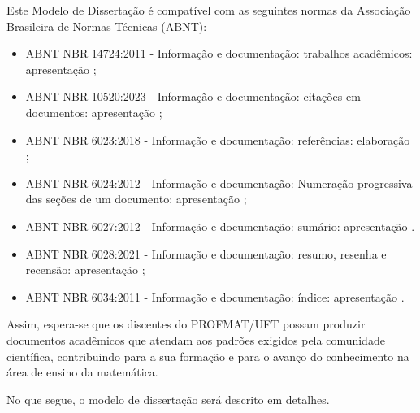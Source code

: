 Este Modelo de Dissertação é compatível com as seguintes normas da Associação Brasileira de Normas Técnicas (ABNT):

\begin{itemize}
	\item ABNT NBR 14724:2011 - Informação
e documentação: trabalhos acadêmicos: apresentação \cite{nbr14724};

    \item ABNT NBR 10520:2023 - Informação
e documentação: citações em documentos: apresentação \cite{nbr10520};

	\item ABNT NBR 6023:2018 - Informação
e documentação: referências: elaboração \cite{nbr6023};

    \item ABNT NBR 6024:2012 - Informação
e documentação: Numeração progressiva das seções de um documento: apresentação \cite{nbr6024};
 
	

	\item ABNT NBR 6027:2012 - Informação
e documentação: sumário: apresentação \cite{nbr6027}.

    \item ABNT NBR 6028:2021 - Informação
e documentação: resumo, resenha e recensão: apresentação \cite{nbr6028};

    	\item ABNT NBR 6034:2011 - Informação
e documentação: índice: apresentação \cite{nbr6034}.
\end{itemize} 

Assim, espera-se que os discentes do PROFMAT/UFT possam produzir documentos acadêmicos que atendam aos padrões exigidos pela comunidade científica, contribuindo para a sua formação e para o avanço do conhecimento na área de ensino da matemática.

No que segue, o modelo de dissertação será descrito em detalhes.


